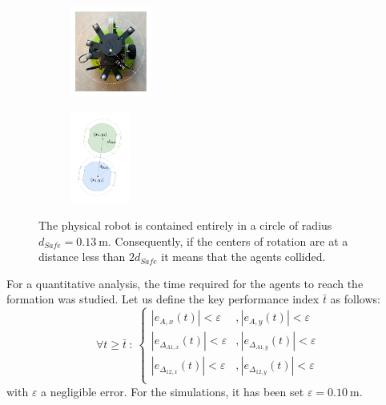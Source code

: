 \documentclass{ifacconf}
\begin{document}
\begin{figure}
    \centering
    \vspace{-0.2cm}
    \hspace{1cm}
   \begin{subfigure}{0.3\columnwidth}
        \includegraphics[height=3cm]{images/robot_dSafe.pdf}
    \end{subfigure}
    \begin{subfigure}{0.3\columnwidth}
        \includegraphics[height=3cm]{images/dSafe.pdf}
    \end{subfigure}
    \caption{The physical robot is contained entirely 
    in a circle of radius $d_{Safe} = \SI{0.13}{\meter}$.
    Consequently, if the centers of rotation are 
    at a distance less than $2d_{Safe}$
    it means that the agents collided.}
    \label{fig:safety_distance}
\end{figure}
For a quantitative analysis, the time required for the agents to reach 
the formation was studied.
Let us define the key performance index $\bar{t}$ as follows:
\begin{equation}
    \forall t \geq \bar{t}\ : \
    \left\{\begin{aligned}
        \left\lvert {e}_{A,x}(t) \right\rvert < \varepsilon &, \left\lvert {e}_{A,y}(t) \right\rvert < \varepsilon \\
        \left\lvert e_{\Delta_{A1,x}}(t) \right\rvert < \varepsilon &, \left\lvert e_{\Delta_{A1,y}}(t)\right\rvert < \varepsilon \\
        \left\lvert e_{\Delta_{12,x}}(t) \right\rvert < \varepsilon &, \left\lvert e_{\Delta_{12,y}}(t) \right\rvert < \varepsilon \\
    \end{aligned} \right.
\end{equation}
with $\varepsilon$ a negligible error. For the simulations, it has been set 
$\varepsilon = \SI{0.10}{\meter}$.
\end{document}
